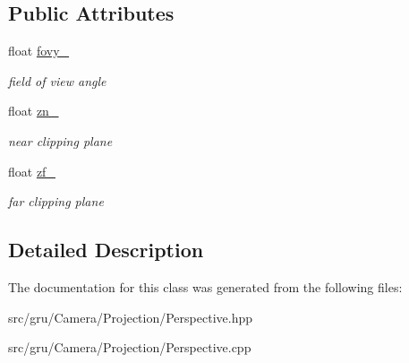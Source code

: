 \subsection*{\-Public \-Attributes}
\begin{DoxyCompactItemize}
\item 
\hypertarget{classglutpp_1_1Camera_1_1Projection_1_1Base_acf034b2276c7e933a2e0ce1036beede1}{float \hyperlink{classglutpp_1_1Camera_1_1Projection_1_1Base_acf034b2276c7e933a2e0ce1036beede1}{fovy\-\_\-}}\label{classglutpp_1_1Camera_1_1Projection_1_1Base_acf034b2276c7e933a2e0ce1036beede1}

\begin{DoxyCompactList}\small\item\em field of view angle \end{DoxyCompactList}\item 
\hypertarget{classglutpp_1_1Camera_1_1Projection_1_1Base_a7fee9eba771a25b2189ba18cce3583c1}{float \hyperlink{classglutpp_1_1Camera_1_1Projection_1_1Base_a7fee9eba771a25b2189ba18cce3583c1}{zn\-\_\-}}\label{classglutpp_1_1Camera_1_1Projection_1_1Base_a7fee9eba771a25b2189ba18cce3583c1}

\begin{DoxyCompactList}\small\item\em near clipping plane \end{DoxyCompactList}\item 
\hypertarget{classglutpp_1_1Camera_1_1Projection_1_1Base_a318bb31bdc6f63546a4bc127223c3295}{float \hyperlink{classglutpp_1_1Camera_1_1Projection_1_1Base_a318bb31bdc6f63546a4bc127223c3295}{zf\-\_\-}}\label{classglutpp_1_1Camera_1_1Projection_1_1Base_a318bb31bdc6f63546a4bc127223c3295}

\begin{DoxyCompactList}\small\item\em far clipping plane \end{DoxyCompactList}\end{DoxyCompactItemize}


\subsection{\-Detailed \-Description}


\-The documentation for this class was generated from the following files\-:\begin{DoxyCompactItemize}
\item 
src/gru/\-Camera/\-Projection/\-Perspective.\-hpp\item 
src/gru/\-Camera/\-Projection/\-Perspective.\-cpp\end{DoxyCompactItemize}
